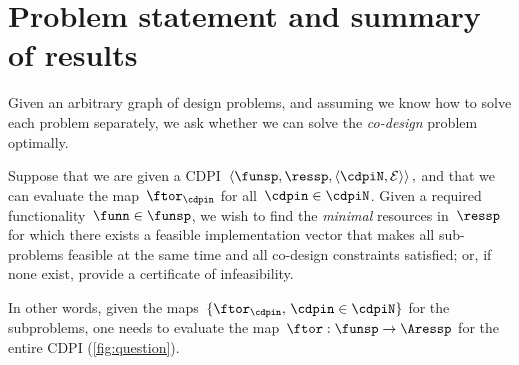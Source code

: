 


\section{Problem statement and summary of results\label{sec:Optimization}}

Given an arbitrary graph of design problems, and assuming we know
how to solve each problem separately, we ask whether we can solve
the \emph{co-design} problem optimally.
\begin{problem}
\label{prob:MCDP}Suppose that we are given a CDPI~$\left\langle \funsp,\ressp,\left\langle \cdpiN,\mathcal{E}\right\rangle \right\rangle ,$
and that we can evaluate the map~$\ftor_{\cdpin}$ for all~$\cdpin\in\cdpiN$.
Given a required functionality~$\funn\in\funsp$, we wish to find
the \emph{minimal} resources in~$\ressp$ for which there exists
a feasible implementation vector that makes all sub-problems feasible
at the same time and all co-design constraints satisfied; or, if
none exist, provide a certificate of infeasibility.
\end{problem}
In other words, given the maps~$\{\ftor_{\cdpin},\,\cdpin\in\cdpiN\}$
for the subproblems, one needs to evaluate the map~$\ftor:\funsp\rightarrow\Aressp$
for the entire CDPI (\cref{fig:question}).

